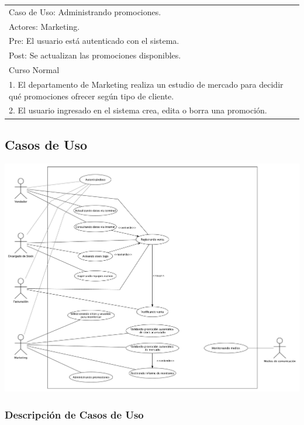 \vspace{1cm}

\begin{tabular}{ | p{14cm} | }
  \hline
  Caso de Uso: Administrando promociones. \\
  Actores: Marketing. \\
  Pre: El usuario está autenticado con el sistema. \\
  Post: Se actualizan las promociones disponibles. \\
  \hline
  Curso Normal\\
  \hline
  1. El departamento de Marketing realiza un estudio de mercado para decidir qué promociones ofrecer según tipo de cliente. \\
  2. El usuario ingresado en el sistema crea, edita o borra una promoción. \\
  \hline
\end{tabular}

\subsection{Casos de Uso}

\includegraphics[width=1.3\textwidth, angle=90]{./imagenes/casos_de_uso.pdf}

\clearpage

\subsubsection{Descripción de Casos de Uso}

